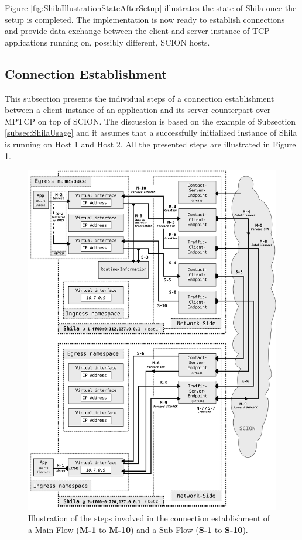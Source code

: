 Figure \ref{fig:ShilaIllustrationStateAfterSetup} illustrates the state of Shila once the setup is completed. The implementation is now ready to establish connections and provide data exchange between the client and server instance of TCP applications running on, possibly different, SCION hosts. 

\subsection*{Connection Establishment}
\label{subsec:ShilaConnectionEstablishment}

This subsection presents the individual steps of a connection establishment between a client instance of an application and its server counterpart over MPTCP on top of SCION. The discussion is based on the example of Subsection \ref{subsec:ShilaUsage} and it assumes that a successfully initialized instance of Shila is running on Host 1 and Host 2. All the presented steps are illustrated in Figure \ref{fig:ShilaIllustrationConnectionEstablishment}. 

\begin{figure}
	\begin{center}
		\def\svgwidth{1\textwidth}
		\includegraphics[scale=0.2]{../illustrations/shilaIntroduction/ConnectionEstablishment.pdf}   
		\caption[Caption for the list of figures.]{Illustration of the steps involved in the connection establishment of a Main-Flow (\textbf{M-1} to \textbf{M-10}) and a Sub-Flow (\textbf{S-1} to \textbf{S-10}).}
		\label{fig:ShilaIllustrationConnectionEstablishment}
	\end{center}
\end{figure}

